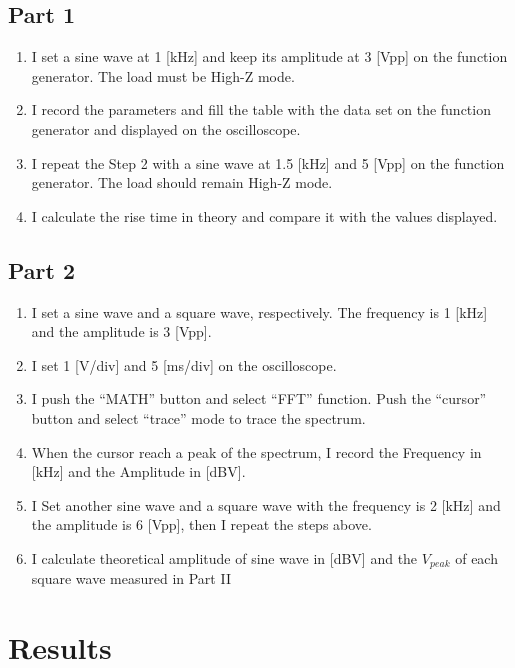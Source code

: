 \documentclass[12pt]{article}
\begin{document}
\subsection{Part 1}
\begin{enumerate}
\item I set a sine wave at 1 [kHz] and keep its amplitude at 3 [Vpp] on the function generator. The load must be High-Z mode.
\item I record the parameters and fill the table with the data set on the function generator and displayed on the oscilloscope.
\item I repeat the Step 2 with a sine wave at 1.5 [kHz] and 5 [Vpp] on the function
generator. The load should remain High-Z mode.
\item I calculate the rise time in theory and compare it with the values displayed.
\end{enumerate}
\subsection{Part 2}
\begin{enumerate}
\item I set a sine wave and a square wave, respectively. The frequency is 1
[kHz] and the amplitude is 3 [Vpp].
\item I set 1 [V/div] and 5 [ms/div] on the oscilloscope.
\item I push the “MATH” button and select “FFT” function. Push the “cursor” button and select “trace” mode to trace the spectrum.
\item When the cursor reach a peak of the spectrum, I record the Frequency in [kHz]
and the Amplitude in [dBV].
\item I Set another sine wave and a square wave with the frequency is 2 [kHz] and the
amplitude is 6 [Vpp], then I repeat the steps above.
\item I calculate theoretical amplitude of sine wave in [dBV] and the $V_{peak}$ of each square wave
measured in Part II
\end{enumerate}
\section{Results}
\end{document}
